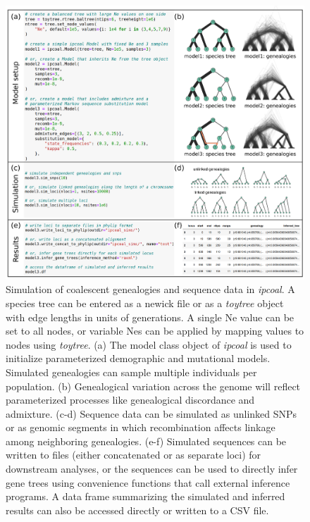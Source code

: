 \documentclass[11pt]{article}
\begin{document}
\begin{figure}
  \centering
  \includegraphics[width=15cm]{figures/composite.pdf}
  \caption{Simulation of coalescent genealogies and sequence data in \emph{ipcoal}. A species tree can be entered as a newick file or as a \emph{toytree} object with edge lengths in units of generations. A single Ne value can be set to all nodes, or variable Nes can be applied by mapping values to nodes using \emph{toytree}. (a) The model class object of \emph{ipcoal} is used to initialize parameterized demographic and mutational models. Simulated genealogies can sample multiple individuals per population. (b) Genealogical variation across the genome will reflect parameterized processes like genealogical discordance and admixture. (c-d) Sequence data can be simulated as unlinked SNPs or as genomic segments in which recombination affects linkage among neighboring genealogies. (e-f) Simulated sequences can be written to files (either concatenated or as separate loci) for downstream analyses, or the sequences can be used to directly infer gene trees using convenience functions that call external inference programs. A data frame summarizing the simulated and inferred results can also be accessed directly or written to a CSV file.}
  \label{fig:fig1}
\end{figure}



  
\end{document}
